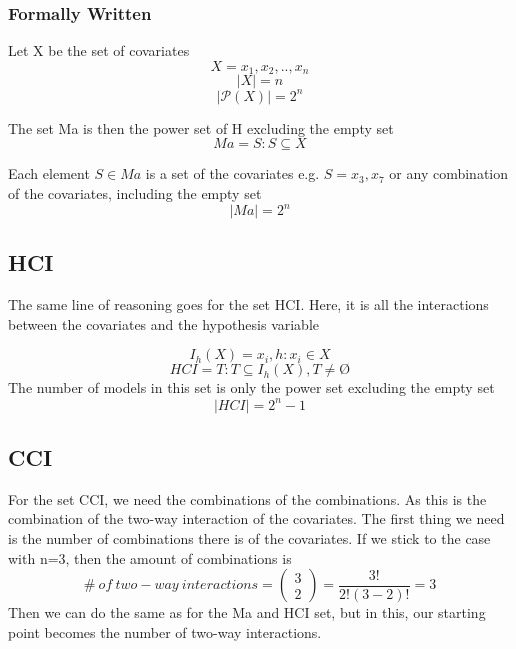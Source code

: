 \subsubsection{Formally Written} \hfill \break 
\noindent Let X be the set of covariates 
\[X=\left.x_1,x_2,..,x_n\right.\] 
\[\left|X\right|=n\] 
\[\left|\mathcal{P}\left(X\right)\right|=2^n\] 


\noindent The set Ma is then the power set of H excluding the empty set
\[Ma=\left.S:S\subseteq X\right.\] 

Each element $S\in Ma$ is a set of the covariates e.g. $S=\left.x_3,x_7\right.$ or any combination of the covariates, including the empty set
\[\left|Ma\right|=2^n\] 
\subsection{HCI}

The same line of reasoning goes for the set HCI. Here, it is all the interactions between the covariates and the hypothesis variable 


\[I_h(X)=\left.\left.x_i,h\right.:x_i\in X\right.\] 
\[HCI=\left.T:T\subseteq I_h\left(X\right),T\neq \textrm{\O}\right.\] 
The number of models in this set is only the power set excluding the empty set
\[\left|HCI\right|\boldsymbol{=}2^n-1\] 


\subsection{CCI}

For the set CCI, we need the combinations of the combinations. As this is the combination of the two-way interaction of the covariates. The first thing we need is the number of combinations there is of the covariates. If we stick to the case with n=3, then the amount of combinations is 
\[\#\ of\ two-way\ interactions=\left( \begin{array}{c}
3 \\ 
2 \end{array}
\right)=\frac{3!}{2!\left(3-2\right)!}=3\] 
Then we can do the same as for the Ma and HCI set, but in this, our starting point becomes the number of two-way interactions. 

